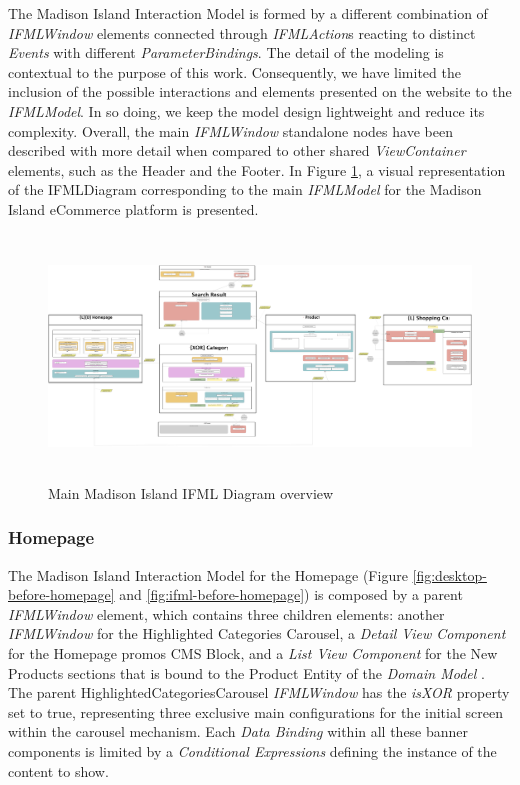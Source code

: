 The Madison Island Interaction Model is formed by a different combination of \textit{IFMLWindow} elements connected through \textit{IFMLAction}s reacting to distinct \textit{Events} with different \textit{ParameterBindings}. The detail of the modeling is contextual to the purpose of this work. Consequently, we have limited the inclusion of the possible interactions and elements presented on the website to the \textit{IFMLModel}. In so doing, we keep the model design lightweight and reduce its complexity. Overall, the main \textit{IFMLWindow} standalone nodes have been described with more detail when compared to other shared \textit{ViewContainer} elements, such as the Header and the Footer. In Figure \ref{fig:ifml-before-global}, a visual representation of the IFMLDiagram corresponding to the main \textit{IFMLModel} for the Madison Island eCommerce platform is presented.

\vspace{0.5cm}
\begin{figure}[H]
  \centering
    \includegraphics[height=6.5cm] {images/diagrams/before/ifml-global.png}
  \caption{Main Madison Island IFML Diagram overview}
  \label{fig:ifml-before-global}
\end{figure}
\vspace{0.5cm}
\newpage
\subsubsection{Homepage}

The Madison Island Interaction Model for the Homepage (Figure \ref{fig:desktop-before-homepage} and \ref{fig:ifml-before-homepage}) is composed by a parent \textit{IFMLWindow} element, which contains three children elements: another \textit{IFMLWindow} for the Highlighted Categories Carousel, a \textit{Detail View Component} for the Homepage promos CMS Block, and a \textit{List View Component} for the New Products sections that is bound to the Product Entity of the \textit{Domain Model} . The parent HighlightedCategoriesCarousel \textit{IFMLWindow} has the \textit{isXOR} property set to true, representing three exclusive main configurations for the initial screen within the carousel mechanism. Each \textit{Data Binding} within all these banner components is limited by a \textit{Conditional Expressions} defining the instance of the content to show.

